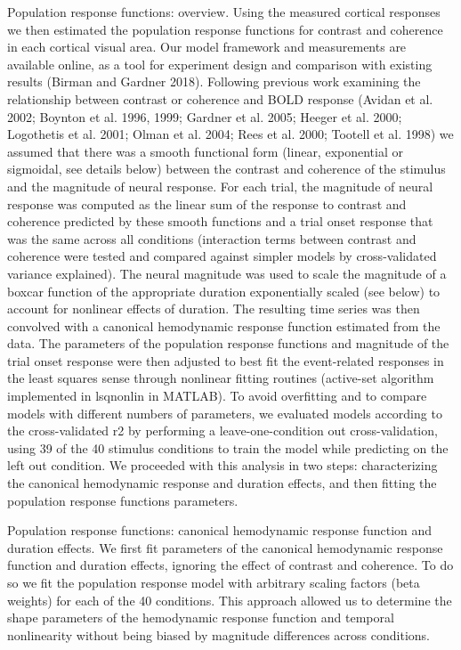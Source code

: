 \documentclass{report}
\begin{document}
Population response functions: overview.
Using the measured cortical responses we then estimated the population response functions for contrast and coherence in each cortical visual area. Our model framework and measurements are available online, as a tool for experiment design and comparison with existing results (Birman and Gardner 2018). Following previous work examining the relationship between contrast or coherence and BOLD response (Avidan et al. 2002; Boynton et al. 1996, 1999; Gardner et al. 2005; Heeger et al. 2000; Logothetis et al. 2001; Olman et al. 2004; Rees et al. 2000; Tootell et al. 1998) we assumed that there was a smooth functional form (linear, exponential or sigmoidal, see details below) between the contrast and coherence of the stimulus and the magnitude of neural response. For each trial, the magnitude of neural response was computed as the linear sum of the response to contrast and coherence predicted by these smooth functions and a trial onset response that was the same across all conditions (interaction terms between contrast and coherence were tested and compared against simpler models by cross-validated variance explained). The neural magnitude was used to scale the magnitude of a boxcar function of the appropriate duration exponentially scaled (see below) to account for nonlinear effects of duration. The resulting time series was then convolved with a canonical hemodynamic response function estimated from the data. The parameters of the population response functions and magnitude of the trial onset response were then adjusted to best fit the event-related responses in the least squares sense through nonlinear fitting routines (active-set algorithm implemented in lsqnonlin in MATLAB). To avoid overfitting and to compare models with different numbers of parameters, we evaluated models according to the cross-validated r2 by performing a leave-one-condition out cross-validation, using 39 of the 40 stimulus conditions to train the model while predicting on the left out condition. We proceeded with this analysis in two steps: characterizing the canonical hemodynamic response and duration effects, and then fitting the population response functions parameters.

Population response functions: canonical hemodynamic response function and duration effects.
We first fit parameters of the canonical hemodynamic response function and duration effects, ignoring the effect of contrast and coherence. To do so we fit the population response model with arbitrary scaling factors (beta weights) for each of the 40 conditions. This approach allowed us to determine the shape parameters of the hemodynamic response function and temporal nonlinearity without being biased by magnitude differences across conditions.
\end{document}
